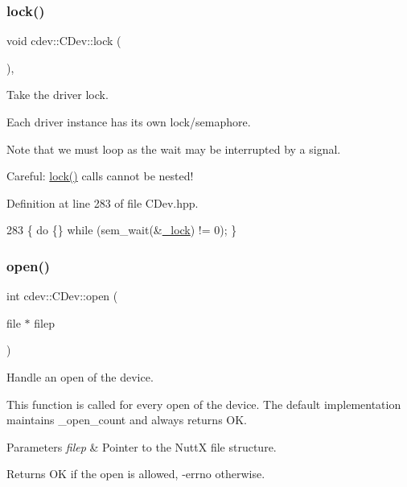 \subsubsection{\texorpdfstring{lock()}{lock()}}
{\footnotesize\ttfamily void cdev\+::\+C\+Dev\+::lock (\begin{DoxyParamCaption}{ }\end{DoxyParamCaption})\hspace{0.3cm}{\ttfamily [inline]}, {\ttfamily [protected]}}

Take the driver lock.

Each driver instance has its own lock/semaphore.

Note that we must loop as the wait may be interrupted by a signal.

Careful\+: \hyperlink{classcdev_1_1CDev_ae676cccee31dd393ab681414a146d868}{lock()} calls cannot be nested! 

Definition at line 283 of file C\+Dev.\+hpp.


\begin{DoxyCode}
283 \{ \textcolor{keywordflow}{do} \{\} \textcolor{keywordflow}{while} (sem\_wait(&\hyperlink{classcdev_1_1CDev_aa9b327dcb42b1160c01417ad64cd8e2b}{\_lock}) != 0); \}
\end{DoxyCode}
\mbox{\label{classcdev_1_1CDev_ac04b7ee91373c86545107e3467ba54c1}} 
\subsubsection{\texorpdfstring{open()}{open()}}
{\footnotesize\ttfamily int cdev\+::\+C\+Dev\+::open (\begin{DoxyParamCaption}\item[{file $\ast$}]{filep }\end{DoxyParamCaption})\hspace{0.3cm}{\ttfamily [virtual]}}

Handle an open of the device.

This function is called for every open of the device. The default implementation maintains \+\_\+open\+\_\+count and always returns OK.


\begin{DoxyParams}{Parameters}
{\em filep} & Pointer to the NuttX file structure. \\
\hline
\end{DoxyParams}
\begin{DoxyReturn}{Returns}
OK if the open is allowed, -\/errno otherwise. 
\end{DoxyReturn}


